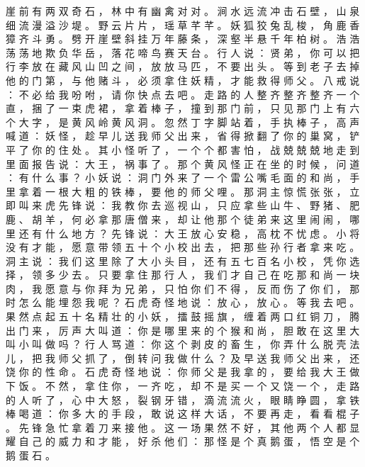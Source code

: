 {崖 前 有 两 双 奇 石 ， 林 中 有 幽 禽 对 对 。
涧 水 远 流 冲 击 石 壁 ， 山 泉 细 流 漫 溢 沙 堤 。
野 云 片 片 ， 瑶 草 芊 芊 。
妖 狐 狡 兔 乱 梭 ， 角 鹿 香 獐 齐 斗 勇 。
劈 开 崖 壁 斜 挂 万 年 藤 条 ， 深 壑 半 悬 千 年 柏 树 。
浩 浩 荡 荡 地 欺 负 华 岳 ， 落 花 啼 鸟 赛 天 台 。
行 人 说 ： 贤 弟 ， 你 可 以 把 行 李 放 在 藏 风 山 凹 之 间 ， 放 放 马 匹 ， 不 要 出 头 。
等 到 老 子 去 掉 他 的 门 第 ， 与 他 赌 斗 ， 必 须 拿 住 妖 精 ， 才 能 救 得 师 父 。
八 戒 说 ： 不 必 给 我 吩 咐 ， 请 你 快 点 去 吧 。
走 路 的 人 整 齐 整 齐 整 齐 一 个 直 ， 捆 了 一 束 虎 裙 ， 拿 着 棒 子 ， 撞 到 那 门 前 ， 只 见 那 门 上 有 六 个 大 字 ， 是 黄 风 岭 黄 风 洞 。
忽 然 丁 字 脚 站 着 ， 手 执 棒 子 ， 高 声 喊 道 ： 妖 怪 ， 趁 早 儿 送 我 师 父 出 来 ， 省 得 掀 翻 了 你 的 巢 窝 ， 铲 平 了 你 的 住 处 。
其 小 怪 听 了 ， 一 个 个 都 害 怕 ， 战 兢 兢 兢 地 走 到 里 面 报 告 说 ： 大 王 ， 祸 事 了 。
那 个 黄 风 怪 正 在 坐 的 时 候 ， 问 道 ： 有 什 么 事 ？ 小 妖 说 ： 洞 门 外 来 了 一 个 雷 公 嘴 毛 面 的 和 尚 ， 手 里 拿 着 一 根 大 粗 的 铁 棒 ， 要 他 的 师 父 哩 。
那 洞 主 惊 慌 张 张 ， 立 即 叫 来 虎 先 锋 说 ： 我 教 你 去 巡 视 山 ， 只 应 拿 些 山 牛 、 野 猪 、 肥 鹿 、 胡 羊 ， 何 必 拿 那 唐 僧 来 ， 却 让 他 那 个 徒 弟 来 这 里 闹 闹 ， 哪 里 还 有 什 么 地 方 ？ 先 锋 说 ： 大 王 放 心 安 稳 ， 高 枕 不 忧 虑 。
小 将 没 有 才 能 ， 愿 意 带 领 五 十 个 小 校 出 去 ， 把 那 些 孙 行 者 拿 来 吃 。
洞 主 说 ： 我 们 这 里 除 了 大 小 头 目 ， 还 有 五 七 百 名 小 校 ， 凭 你 选 择 ， 领 多 少 去 。
只 要 拿 住 那 行 人 ， 我 们 才 自 己 在 吃 那 和 尚 一 块 肉 ， 我 愿 意 与 你 拜 为 兄 弟 ， 只 怕 你 们 不 得 ， 反 而 伤 了 你 们 ， 那 时 怎 么 能 埋 怨 我 呢 ？
石 虎 奇 怪 地 说 ： 放 心 ， 放 心 。
等 我 去 吧 。
果 然 点 起 五 十 名 精 壮 的 小 妖 ， 擂 鼓 摇 旗 ， 缠 着 两 口 红 铜 刀 ， 腾 出 门 来 ， 厉 声 大 叫 道 ： 你 是 哪 里 来 的 个 猴 和 尚 ， 胆 敢 在 这 里 大 叫 小 叫 做 吗 ？ 行 人 骂 道 ： 你 这 个 剥 皮 的 畜 生 ， 你 弄 什 么 脱 壳 法 儿 ， 把 我 师 父 抓 了 ， 倒 转 问 我 做 什 么 ？
及 早 送 我 师 父 出 来 ， 还 饶 你 的 性 命 。
石 虎 奇 怪 地 说 ： 你 师 父 是 我 拿 的 ， 要 给 我 大 王 做 下 饭 。
不 然 ， 拿 住 你 ， 一 齐 吃 ， 却 不 是 买 一 个 又 饶 一 个 ， 走 路 的 人 听 了 ， 心 中 大 怒 ， 裂 钢 牙 错 ， 滴 流 流 火 ， 眼 睛 睁 圆 ， 拿 铁 棒 喝 道 ： 你 多 大 的 手 段 ， 敢 说 这 样 大 话 ， 不 要 再 走 ， 看 看 棍 子 。
先 锋 急 忙 拿 着 刀 来 接 他 。
这 一 场 果 然 不 好 ， 其 他 两 个 人 都 显 耀 自 己 的 威 力 和 才 能 ， 好 杀 他 们 ： 那 怪 是 个 真 鹅 蛋 ， 悟 空 是 个 鹅 蛋 石 。
}
